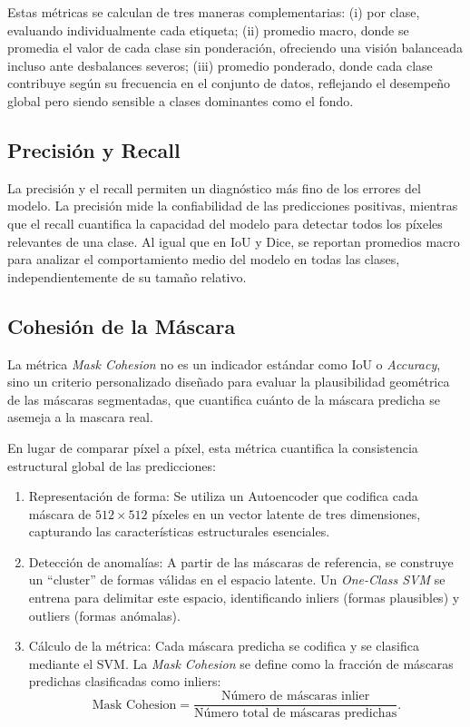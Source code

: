 \documentclass[onecolumn, 12pt , journal]{IEEEtran}
\begin{document}
Estas métricas se calculan de tres maneras complementarias:
(i) por clase, evaluando individualmente cada etiqueta;
(ii) promedio macro, donde se promedia el valor de cada clase sin ponderación, ofreciendo una visión balanceada incluso ante desbalances severos;
(iii) promedio ponderado, donde cada clase contribuye según su frecuencia en el conjunto de datos, reflejando el desempeño global pero siendo sensible a clases dominantes como el fondo.

\subsection{Precisión y Recall}
La precisión y el recall permiten un diagnóstico más fino de los errores del modelo. La precisión mide la confiabilidad de las predicciones positivas, mientras que el recall cuantifica la capacidad del modelo para detectar todos los píxeles relevantes de una clase. Al igual que en IoU y Dice, se reportan promedios macro para analizar el comportamiento medio del modelo en todas las clases, independientemente de su tamaño relativo.

\subsection{Cohesión de la Máscara}

La métrica \emph{Mask Cohesion} no es un indicador estándar como IoU o \emph{Accuracy}, sino un criterio personalizado diseñado para evaluar la plausibilidad geométrica de las máscaras segmentadas, que cuantifica cuánto de la máscara predicha se asemeja a la mascara real.

En lugar de comparar píxel a píxel, esta métrica cuantifica la consistencia estructural global de las predicciones:

\begin{enumerate}
    \item Representación de forma: Se utiliza un Autoencoder que codifica cada máscara de $512\times512$ píxeles en un vector latente de tres dimensiones, capturando las características estructurales esenciales.
    
    \item Detección de anomalías: A partir de las máscaras de referencia, se construye un ``cluster'' de formas válidas en el espacio latente. Un \emph{One-Class SVM} se entrena para delimitar este espacio, identificando inliers (formas plausibles) y outliers (formas anómalas).
    
    \item Cálculo de la métrica: Cada máscara predicha se codifica y se clasifica mediante el SVM. La \emph{Mask Cohesion} se define como la fracción de máscaras predichas clasificadas como inliers:
    \[
        \text{Mask Cohesion} = \frac{\text{Número de máscaras inlier}}{\text{Número total de máscaras predichas}}.
    \]
\end{enumerate}
\end{document}
